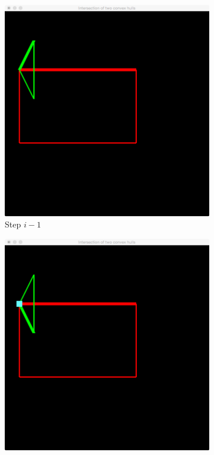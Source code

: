 		\begin{figure}
			\begin{subfigure}{0.24\textwidth}
				\includegraphics[width=\textwidth]{./img/b_step_0_deg_two}
				\caption{Step $i - 1$}
				\label{subfig:b:vertexOnVertex:step0}			
			\end{subfigure}		
			\begin{subfigure}{0.24\textwidth}
				\includegraphics[width=\textwidth]{./img/b_step_1_deg_two}

\end{subfigure}
\end{figure}
